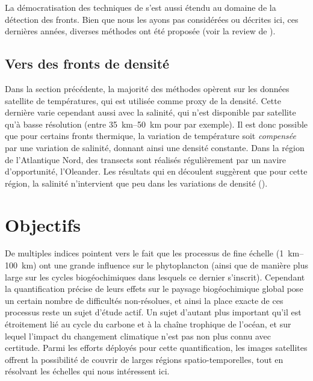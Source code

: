 \begin{note}
  La démocratisation des techniques de  s'est aussi étendu au domaine de la détection des fronts.
  Bien que nous les ayons pas considérées ou décrites ici, ces dernières années, diverses méthodes ont été proposée (voir la review de \cite{liu_2022}).
\end{note}

\subsection{Vers des fronts de densité}

Dans la section précédente, la majorité des méthodes opèrent sur les données satellite de températures, qui est utilisée comme proxy de la densité.
Cette dernière varie cependant aussi avec la salinité, qui n'est disponible par satellite qu'à basse résolution (entre \qtyrange[range-phrase={ et }]{35}{50}{\km} pour  par exemple).
Il est donc possible que pour certains fronts thermique, la variation de température soit \emph{compensée} par une variation de salinité, donnant ainsi une densité constante.
Dans la région de l'Atlantique Nord, des transects sont réalisés régulièrement par un navire d'opportunité, l'Oleander.
Les résultats qui en découlent suggèrent que pour cette région, la salinité n'intervient que peu dans les variations de densité (\cite{flagg_2006}).


\section{Objectifs}
\label{sec:problematique}

De multiples indices pointent vers le fait que les processus de fine échelle \OM(\qtyrange{1}{100}{\km}) ont une grande influence sur le phytoplancton (ainsi que de manière plus large sur les cycles biogéochimiques dans lesquels ce dernier s'inscrit).
Cependant la quantification précise de leurs effets sur le paysage biogéochimique global pose un certain nombre de difficultés non-résolues, et ainsi la place exacte de ces processus reste un sujet d'étude actif.
Un sujet d'autant plus important qu'il est étroitement lié au cycle du carbone et à la chaîne trophique de l'océan, et sur lequel l'impact du changement climatique n'est pas non plus connu avec certitude.
Parmi les efforts déployés pour cette quantification, les images satellites offrent la possibilité de couvrir de larges régions spatio-temporelles, tout en résolvant les échelles qui nous intéressent ici.

